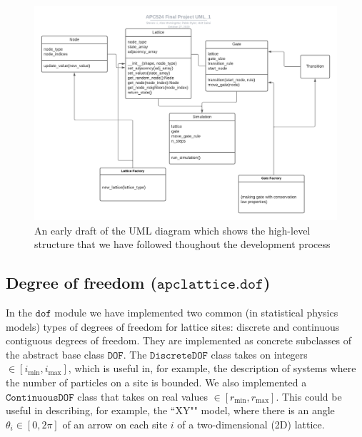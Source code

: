 \documentclass{article}
\begin{document}
\begin{figure}[ht]
    \centering
    \includegraphics[width=1\textwidth]{APC524_FinalProject_UML.png}
    \caption{An early draft of the UML diagram which shows the high-level structure that we have followed thoughout the development process}
    \label{fig:uml}
\end{figure}

\subsection{Degree of freedom ($\texttt{apclattice.dof}$)}
In the $\texttt{dof}$ module we have implemented two common (in statistical physics models) types of degrees of freedom for lattice sites: discrete and continuous contiguous degrees of freedom. They are implemented as concrete subclasses of the abstract base class $\texttt{DOF}$. The $\texttt{DiscreteDOF}$ class takes on integers $\in [i_\mathrm{min}, i_\mathrm{max}]$, which is useful in, for example, the description of systems where the number of particles on a site is bounded. We also implemented a $\texttt{ContinuousDOF}$ class that takes on real values $\in [r_\mathrm{min}, r_\mathrm{max}]$. This could be useful in describing, for example, the ``XY"" model, where there is an angle $\theta_i \in [0, 2 \pi]$ of an arrow on each site $i$ of a two-dimensional (2D) lattice.
\end{document}
